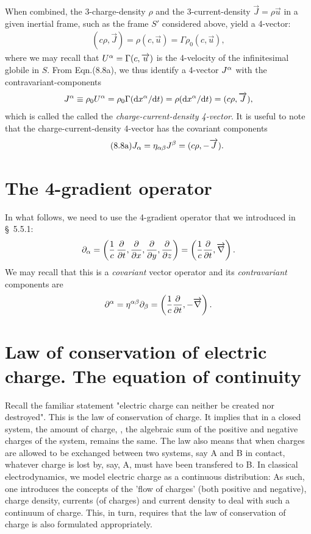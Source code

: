 When combined, the 3-charge-density $\rho$ and the 
3-current-density  $\vec{J}=\rho \vec{u}$ in a given 
inertial frame, such as the frame $S'$ considered 
above, yield a 4-vector:
\begin{align}\tag{8.8a}
( c\rho, \vec{J})=\rho( c, \vec{u}) = \Gamma \rho_0
( c, \vec{u}),
\end{align}
where we may recall that  $U^{{\alpha}} =\Gamma ( c, \overrightarrow{u})$ is 
the 4-velocity of the infinitesimal globile in $S$.  From 
Eqn.(8.8a), we thus identify a 4-vector $J^{{\alpha}}$ with 
the contravariant-components 
\begin{align}\label{ved.8}
J^{{\alpha}} \equiv \rho_0 U^{{\alpha}} 
= \rho_0\Gamma(\mathrm{d}{x^{{\alpha}}} / \mathrm{d}{t})=\rho(\mathrm{d}{x^{{\alpha}}} / \mathrm{d}{t})
=( c\rho, \overrightarrow{J}),
\end{align}
which is called the called the 
\textsl{charge-current-density 4-vector}. It is useful to 
note that the charge-current-density 4-vector has the 
covariant components 
\begin{align}\tag{8.8a}
J_{{\alpha}} =\eta_{{\alpha} {\beta}}J^{{\beta}} =( c\rho, -\overrightarrow{J}).
\end{align}
\section{The 4-gradient operator}
In what follows, we need to use the 4-gradient operator that
we introduced in \S~5.5.1:
\begin{align}\label{ved.9}
{\ensuremath{\partial}}_{{\alpha}} =\left(\frac{1}{c}\,\frac{{\partial}}{{\partial} t}, 
\frac{{\partial}}{{\partial} x}, \frac{{\partial}}{{\partial} y}, 
\frac{{\partial}}{{\partial} z}\right)
=\left(\frac{1}{c}\frac{{\partial}}{{\partial} t},{\overrightarrow{\nabla} } \right).
\end{align}
We may recall that this is a \textsl{covariant} vector 
operator and its  \textsl{contravariant} components are
\begin{align}\label{ved.10}
{\ensuremath{\partial}}^{{\alpha}} =\eta^{{\alpha} {\beta}}{\partial}_{{\beta}}
= \left(\frac{1}{c}\frac{{\partial}}{{\partial} t},-{\overrightarrow{\nabla} } \right).
\end{align}
\section{Law of conservation of electric charge. The 
equation of continuity}
Recall the familiar statement  "electric charge can neither 
be created nor destroyed". This is the law of conservation 
of charge. It implies that in  a closed system, the amount 
of charge, \ie, the algebraic sum of the positive and 
negative charges of the system, remains the same. The law 
also means that when charges are allowed to be exchanged 
between two systems, say A and B in contact, whatever charge 
is lost by, say, A,  must have been  transfered to B. In 
classical electrodynamics, we model electric charge as a 
continuous distribution: As such, one introduces the 
concepts  of the 'flow of charges' (both positive and 
negative), charge density,  currents (of charges) and 
current density to deal with such a continuum of charge. 
This, in turn, requires that the law of conservation of 
charge is also formulated appropriately. 

